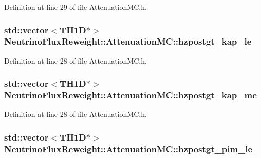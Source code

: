 Definition at line 29 of file Attenuation\-M\-C.\-h.

\hypertarget{class_neutrino_flux_reweight_1_1_attenuation_m_c_aa62930aa4128449906cd2b661a063355}{
\subsubsection[{hzpostgt\-\_\-kap\-\_\-le}]{\setlength{\rightskip}{0pt plus 5cm}std\-::vector$<$T\-H1\-D$\ast$$>$ Neutrino\-Flux\-Reweight\-::\-Attenuation\-M\-C\-::hzpostgt\-\_\-kap\-\_\-le}}\label{class_neutrino_flux_reweight_1_1_attenuation_m_c_aa62930aa4128449906cd2b661a063355}


Definition at line 28 of file Attenuation\-M\-C.\-h.

\hypertarget{class_neutrino_flux_reweight_1_1_attenuation_m_c_aec1b443980cc76c016d34149707d0961}{
\subsubsection[{hzpostgt\-\_\-kap\-\_\-me}]{\setlength{\rightskip}{0pt plus 5cm}std\-::vector$<$T\-H1\-D$\ast$$>$ Neutrino\-Flux\-Reweight\-::\-Attenuation\-M\-C\-::hzpostgt\-\_\-kap\-\_\-me}}\label{class_neutrino_flux_reweight_1_1_attenuation_m_c_aec1b443980cc76c016d34149707d0961}


Definition at line 28 of file Attenuation\-M\-C.\-h.

\hypertarget{class_neutrino_flux_reweight_1_1_attenuation_m_c_a8e2000306243ba7ee0e93814ded1c964}{
\subsubsection[{hzpostgt\-\_\-pim\-\_\-le}]{\setlength{\rightskip}{0pt plus 5cm}std\-::vector$<$T\-H1\-D$\ast$$>$ Neutrino\-Flux\-Reweight\-::\-Attenuation\-M\-C\-::hzpostgt\-\_\-pim\-\_\-le}}\label{class_neutrino_flux_reweight_1_1_attenuation_m_c_a8e2000306243ba7ee0e93814ded1c964}


